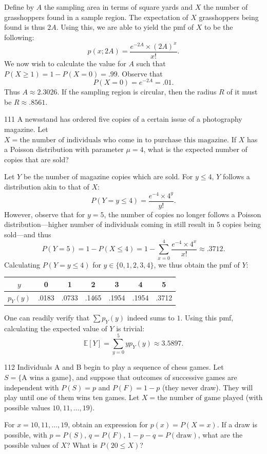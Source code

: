 \documentclass{exam}
\begin{document}
Define by $A$ the sampling area in terms of square yards and $X$ the number of grasshoppers found in a sample region. The expectation of $X$ grasshoppers being found is thus $2A$. Using this, we are able to yield the pmf of $X$ to be the following:
\[
	p(x; 2A) = \frac{e^{-2A} \times (2A)^x}{x!}.
\]
We now wish to calculate the value for $A$ such that $P(X \ge 1) = 1 - P(X = 0) = .99$. Observe that
\[
	P(X = 0) = e^{-2A} = .01.
\]
Thus $A \approx 2.3026$. If the sampling region is circular, then the radius $R$ of it must be $R \approx .8561$.

\begin{problem}{111}
	A newsstand has ordered five copies of a certain issue of a photography magazine. Let $X = \text{the number of individuals who come in to purchase this magazine}$. If $X$ has a Poisson distribution with parameter $\mu = 4$, what is the expected number of copies that are sold?
\end{problem}

Let $Y$ be the number of magazine copies which are sold. For $y \le 4$, $Y$ follows a distribution akin to that of $X$:
\[
	P(Y = y \le 4) = \frac{e^{-4}\times 4^y}{y!}.
\]
However, observe that for $y = 5$, the number of copies no longer follows a Poisson distribution---higher number of individuals coming in still result in 5 copies being sold---and thus
\[
	P(Y = 5) = 1 - P(X \le 4) = 1 - \sum_{x = 0}^4 \frac{e^{-4} \times 4^x}{x!} \approx .3712.
\]
Calculating $P(Y = y \le 4)$ for $y \in \{0, 1, 2, 3, 4\}$, we thus obtain the pmf of $Y$:
\begin{center}
	\bgroup
	\def\arraystretch{1.5}
	\begin{tabular}{c|cccccc}
		$y$ & 0 & 1 & 2 & 3 & 4 & 5 \\
		\hline
		$p_Y(y)$ & .0183 & .0733 & .1465 & .1954 & .1954 & .3712
	\end{tabular}
	\egroup
\end{center}
One can readily verify that $\sum p_Y(y)$ indeed sums to $1$. Using this pmf, calculating the expected value of $Y$ is trivial:
\[
	\mathbb E[Y] = \sum_{y = 0}^5 yp_Y(y) \approx 3.5897.
\]

\begin{problem}{112}
	Individuals A and B begin to play a sequence of chess games. Let $S = \{\text{A wins a game}\}$, and suppose that outcomes of successive games are independent with $P(S) = p$ and $P(F) = 1 - p$ (they never draw). They will play until one of them wins ten games. Let $X = \text{the number of game played}$ (with possible values $10, 11, \dots, 19$).
	\begin{tasks}[label=\textbf{\alph*.}]
		\task For $x = 10, 11, \dots, 19$, obtain an expression for $p(x) = P(X = x)$.
		\task If a draw is possible, with $p = P(S)$, $q = P(F)$, $1 - p - q = P(\text{draw})$, what are the possible values of $X$? What is $P(20 \le X)$?
	\end{tasks}
\end{problem}
\end{document}
